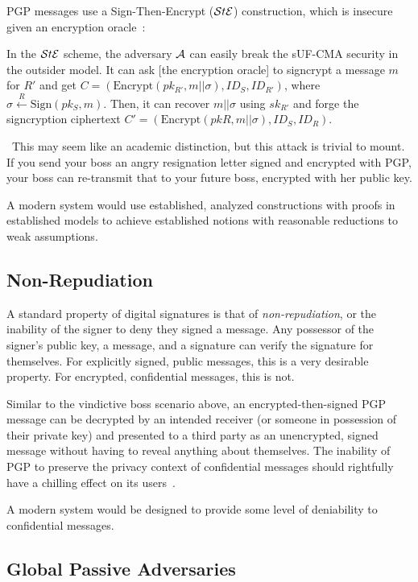 PGP messages use a Sign-Then-Encrypt ($\mathcal{S}t\mathcal{E}$) construction, which is insecure given an encryption
oracle~\cite[p. 41]{an2010}:

\begin{displayquote}
    In the $\mathcal{S}t\mathcal{E}$ scheme, the adversary $\mathcal{A}$ can easily break the sUF-CMA security in the outsider model.
    It can ask [the encryption oracle] to signcrypt a message $m$ for $R'$ and get
    $C=(\text{Encrypt}(pk_{R'},m||\sigma),ID_S,ID_{R'})$, where $\sigma \stackrel{R}{\gets} \text{Sign}(pk_S,m)$.
    Then, it can recover $m||\sigma$ using $sk_{R'}$ and forge the signcryption ciphertext
    $C' = (\text{Encrypt}(pkR,m||\sigma),ID_S,ID_R)$.
\end{displayquote}

~This may seem like an academic distinction, but this attack is trivial to mount.
If you send your boss an angry resignation letter signed and encrypted with PGP, your boss can re-transmit that to your
future boss, encrypted with her public key.

A modern system would use established, analyzed constructions with proofs in established models to achieve established
notions with reasonable reductions to weak assumptions.

\subsection{Non-Repudiation}\label{subsec:non-repudiation}

A standard property of digital signatures is that of \emph{non-repudiation}, or the inability of the signer to deny they
signed a message.
Any possessor of the signer's public key, a message, and a signature can verify the signature for themselves.
For explicitly signed, public messages, this is a very desirable property.
For encrypted, confidential messages, this is not.

Similar to the vindictive boss scenario above, an encrypted-then-signed PGP message can be decrypted by an intended
receiver (or someone in possession of their private key) and presented to a third party as an unencrypted, signed
message without having to reveal anything about themselves.
The inability of PGP to preserve the privacy context of confidential messages should rightfully have a chilling effect
on its users~\cite{borisov2004}.

A modern system would be designed to provide some level of deniability to confidential messages.

\subsection{Global Passive Adversaries}\label{subsec:global-passive-adversaries}


